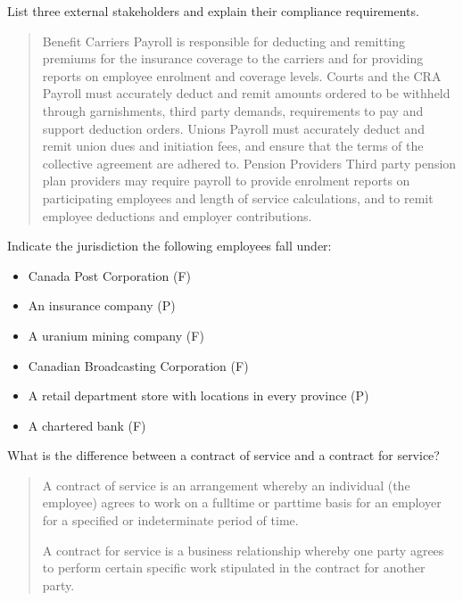 \documentclass[letterpaper,10pt,english]{sphinxmanual}
\begin{document}
\sphinxAtStartPar
List three external stakeholders and explain their compliance requirements.
\begin{quote}

\sphinxAtStartPar
Benefit Carriers \sphinxhyphen{} Payroll is responsible for deducting and remitting premiums for the insurance coverage to the carriers and for providing reports on employee enrolment and coverage levels.
Courts and the CRA \sphinxhyphen{} Payroll must accurately deduct and remit amounts ordered to be withheld through garnishments, third party demands, requirements to pay and support deduction orders.
Unions \sphinxhyphen{} Payroll must accurately deduct and remit union dues and initiation fees, and ensure that the terms of the collective agreement are adhered to.
Pension Providers \sphinxhyphen{} Third party pension plan providers may require payroll to provide enrolment reports on participating employees and length of service calculations, and to remit employee deductions and employer contributions.
\end{quote}

\sphinxAtStartPar
Indicate the jurisdiction the following employees fall under:
\begin{itemize}
\item {} 
\sphinxAtStartPar
Canada Post Corporation (F)

\item {} 
\sphinxAtStartPar
An insurance company (P)

\item {} 
\sphinxAtStartPar
A uranium mining company (F)

\item {} 
\sphinxAtStartPar
Canadian Broadcasting Corporation (F)

\item {} 
\sphinxAtStartPar
A retail department store with locations in every province (P)

\item {} 
\sphinxAtStartPar
A chartered bank (F)

\end{itemize}

\sphinxAtStartPar
What is the difference between a contract of service and a contract for service?
\begin{quote}

\sphinxAtStartPar
A contract of service is an arrangement whereby an individual (the employee) agrees to work on a full\sphinxhyphen{}time or part\sphinxhyphen{}time basis for an employer for a specified or indeterminate period of time.

\sphinxAtStartPar
A contract for service is a business relationship whereby one party agrees to perform certain specific work stipulated in the contract for another party.
\end{quote}
\end{document}
